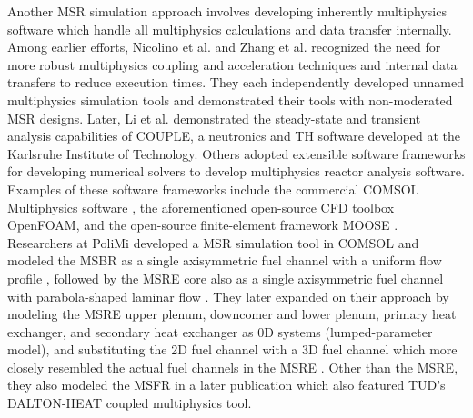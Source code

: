 Another \gls{MSR} simulation approach involves developing inherently multiphysics software which
handle all multiphysics calculations and data transfer internally. Among earlier efforts, Nicolino
et al. \cite{nicolino_coupled_2008} and Zhang et al. \cite{zhang_development_2009} recognized the
need for more robust multiphysics coupling and acceleration techniques and internal data transfers
to reduce execution times. They each independently developed unnamed multiphysics simulation tools
and demonstrated their tools with non-moderated \gls{MSR}
designs. Later, Li et al. \cite{li_transient_2015} demonstrated the
steady-state and transient analysis capabilities of COUPLE, a neutronics and
\gls{TH} software developed at the Karlsruhe Institute of Technology.
Others adopted extensible software frameworks for developing numerical solvers
to develop multiphysics reactor analysis software. Examples of these software
frameworks include the commercial COMSOL
Multiphysics\textsuperscript{\textregistered} software
\cite{comsol_ab_comsol_nodate}, the aforementioned open-source CFD toolbox
OpenFOAM, and the open-source finite-element
framework \gls{MOOSE} \cite{gaston_physics-based_2015}. Researchers at
\gls{PoliMi} developed a \gls{MSR} simulation tool in COMSOL and
modeled the \gls{MSBR} as a single axisymmetric fuel channel with a uniform
flow profile \cite{cammi_multi-physics_2011}, followed by the \gls{MSRE} core
also as a single axisymmetric fuel channel with parabola-shaped laminar flow
\cite{cammi_dimensional_2012}. They later expanded on their approach by
modeling the \gls{MSRE} upper plenum, downcomer and lower plenum, primary heat
exchanger, and secondary heat exchanger as 0D systems (lumped-parameter model),
and substituting the 2D fuel channel with a 3D fuel channel which more closely
resembled the actual fuel channels in the \gls{MSRE}
\cite{zanetti_geometric_2015}. Other than the \gls{MSRE}, they also modeled the
\gls{MSFR} in a later publication \cite{fiorina_modelling_2014} which also featured \gls{TUD}'s
DALTON-HEAT coupled multiphysics tool.

